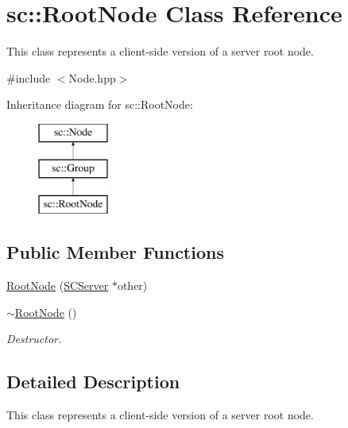 \hypertarget{classsc_1_1RootNode}{\section{sc\-:\-:Root\-Node Class Reference}
\label{classsc_1_1RootNode}
}


This class represents a client-\/side version of a server root node.  




{\ttfamily \#include $<$Node.\-hpp$>$}

Inheritance diagram for sc\-:\-:Root\-Node\-:\begin{figure}[H]
\begin{center}
\leavevmode
\includegraphics[height=3.000000cm]{classsc_1_1RootNode}
\end{center}
\end{figure}
\subsection*{Public Member Functions}
\begin{DoxyCompactItemize}
\item 
\hyperlink{classsc_1_1RootNode_a6ce777b07fdd3ea007dee967d9aadb3d}{Root\-Node} (\hyperlink{classsc_1_1SCServer}{S\-C\-Server} $\ast$other)
\item 
\hypertarget{classsc_1_1RootNode_a6dc8c84f94d46d7586cbcbd059b64a41}{\hyperlink{classsc_1_1RootNode_a6dc8c84f94d46d7586cbcbd059b64a41}{$\sim$\-Root\-Node} ()}\label{classsc_1_1RootNode_a6dc8c84f94d46d7586cbcbd059b64a41}

\begin{DoxyCompactList}\small\item\em Destructor. \end{DoxyCompactList}\end{DoxyCompactItemize}


\subsection{Detailed Description}
This class represents a client-\/side version of a server root node. 

